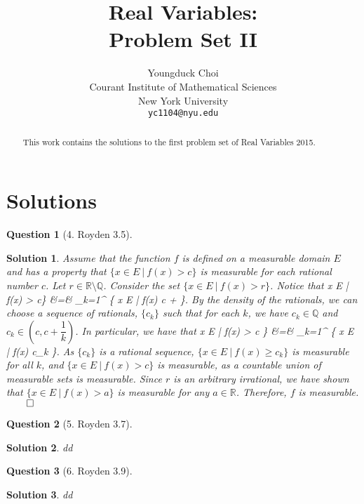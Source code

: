 \documentclass{article} %
\title{Real Variables: \\
Problem Set II}
\author{
Youngduck Choi \\
Courant Institute of Mathematical Sciences \\
New York University \\
\texttt{yc1104@nyu.edu} \\
}
\def\eQb#1\eQe{\begin{eqnarray*}#1\end{eqnarray*}}
\theoremstyle{quest}
\newtheorem*{question}{Question}
\newtheorem*{solution}{Solution}
\begin{document}
\maketitle

\begin{abstract}
This work contains the solutions to the first problem set of Real Variables 2015.
\end{abstract}

\section{Solutions}

\begin{question}[4. Royden 3.5]
\end{question}
\begin{solution}
Assume that the function $f$ is defined on a measurable domain $E$ and has a property that
$\{ x \in E \> | \> f(x) > c \}$ is measurable for each rational number $c$. Let $r \in \mathbb{R} 
\setminus \mathbb{Q}$. Consider the set $\{ x \in E \> | \> f(x) > r \}$. Notice that
\eQb
\{ x \in E \> | \> f(x) > c\} &=& \bigcup_{k=1}^{\infty}
\{ x \in E \> | \> f(x) \geq c +  \}.
\eQe
By the density of the rationals, we can choose a sequence of rationals,
$\{ c_k \}$ such that for each $k$, we have $c_k \in \mathbb{Q}$ and 
$c_k \in (c, c + \dfrac{1}{k})$. In particular, we have that 
\eQb
\{ x \in E \> | \> f(x) > c \}
&=& \bigcup_{k=1}^{\infty} \{ x \in E \> | \> f(x) \geq c_k \}.
\eQe
As $\{ c_k \}$ is a rational sequence, 
$\{ x \in E \> | \> f(x) \geq c_k \}$ is measurable for all $k$, and 
$\{ x \in E \> | \> f(x) > c \}$ is measurable, as a countable union of measurable sets is measurable.
Since $r$ is an arbitrary irrational, we have shown that 
$\{ x \in E \> | \> f(x) > a \}$ is measurable for any $a \in \mathbb{R}$. Therefore, $f$ is 
measurable. $\qed$

\end{solution}

\bigskip


\begin{question}[5. Royden 3.7]
\end{question}
\begin{solution}
dd
\end{solution}

\bigskip

\begin{question}[6. Royden 3.9]
\end{question}
\begin{solution}
dd
\end{solution}


\bigskip
\end{document}
